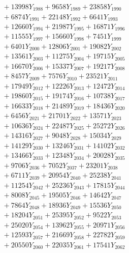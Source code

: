 \documentclass[a4paper,10pt]{article}
\begin{document}
{\begin{align}
&\;  + 13998 Y_{1988} + 9658 Y_{1989} + 23858 Y_{1990} \\[0.3ex]
&\;  + 6874 Y_{1991} + 22148 Y_{1992} + 6641 Y_{1993} \\[0.3ex]
&\;  + 12660 Y_{1994} + 21987 Y_{1995} + 16871 Y_{1996} \\[0.3ex]
&\;  + 11555 Y_{1997} + 15660 Y_{1998} + 7451 Y_{1999} \\[0.3ex]
&\;  + 6401 Y_{2000} + 12806 Y_{2001} + 19082 Y_{2002} \\[0.3ex]
&\;  + 13561 Y_{2003} + 11275 Y_{2004} + 19715 Y_{2005} \\[0.3ex]
&\;  + 16670 Y_{2006} + 15337 Y_{2007} + 19217 Y_{2008} \\[0.5ex]\allowbreak
&\;  + 8457 Y_{2009} + 7576 Y_{2010} + 23521 Y_{2011} \\[0.3ex]
&\;  + 17949 Y_{2012} + 12226 Y_{2013} + 12472 Y_{2014} \\[0.3ex]
&\;  + 19860 Y_{2015} + 19174 Y_{2016} + 10738 Y_{2017} \\[0.3ex]
&\;  + 16633 Y_{2018} + 21489 Y_{2019} + 18436 Y_{2020} \\[0.3ex]
&\;  + 6456 Y_{2021} + 21701 Y_{2022} + 13571 Y_{2023} \\[0.3ex]
&\;  + 10636 Y_{2024} + 22487 Y_{2025} + 25272 Y_{2026} \\[0.3ex]
&\;  + 14316 Y_{2027} + 9048 Y_{2028} + 15034 Y_{2029} \\[0.3ex]
&\;  + 14129 Y_{2030} + 13246 Y_{2031} + 14102 Y_{2032} \\[0.3ex]
&\;  + 13466 Y_{2033} + 12348 Y_{2034} + 20028 Y_{2035} \\[0.3ex]
&\;  + 9706 Y_{2036} + 7052 Y_{2037} + 23201 Y_{2038} \\[0.5ex]\allowbreak
&\;  + 6711 Y_{2039} + 20954 Y_{2040} + 25238 Y_{2041} \\[0.3ex]
&\;  + 11254 Y_{2042} + 25236 Y_{2043} + 17815 Y_{2044} \\[0.3ex]
&\;  + 8008 Y_{2045} + 19505 Y_{2046} + 14642 Y_{2047} \\[0.3ex]
&\;  + 7864 Y_{2048} + 18936 Y_{2049} + 15536 Y_{2050} \\[0.3ex]
&\;  + 18204 Y_{2051} + 25395 Y_{2052} + 9522 Y_{2053} \\[0.3ex]
&\;  + 25020 Y_{2054} + 13962 Y_{2055} + 20971 Y_{2056} \\[0.3ex]
&\;  + 12593 Y_{2057} + 21669 Y_{2058} + 22782 Y_{2059} \\[0.3ex]
&\;  + 20550 Y_{2060} + 22035 Y_{2061} + 17541 Y_{2062} \\[0.3ex]

\end{align}}
\end{document}
